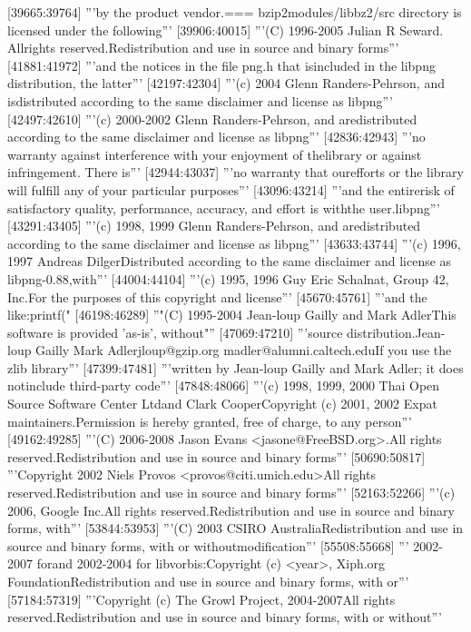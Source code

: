 \documentclass[10pt,a4paper]{article}
\begin{document}
{[39665:39764] '''by the product vendor.\n\n=== bzip2\n\nThe modules/libbz2/src directory is licensed under the following'''
[39906:40015] '''(C) 1996-2005 Julian R Seward.  All\n  rights reserved.\n  \n  Redistribution and use in source and binary forms'''
[41881:41972] '''and the notices in the file png.h that is\n  included in the libpng distribution, the latter'''
[42197:42304] '''(c) 2004 Glenn Randers-Pehrson, and is\n  distributed according to the same disclaimer and license as libpng'''
[42497:42610] '''(c) 2000-2002 Glenn Randers-Pehrson, and are\n  distributed according to the same disclaimer and license as libpng'''
[42836:42943] '''no warranty against interference with your enjoyment of the\n     library or against infringement.  There is'''
[42944:43037] '''no warranty that our\n     efforts or the library will fulfill any of your particular purposes'''
[43096:43214] '''and the entire\n     risk of satisfactory quality, performance, accuracy, and effort is with\n     the user.\n  \n  libpng'''
[43291:43405] '''(c) 1998, 1999 Glenn Randers-Pehrson, and are\n  distributed according to the same disclaimer and license as libpng'''
[43633:43744] '''(c) 1996, 1997 Andreas Dilger\n  Distributed according to the same disclaimer and license as libpng-0.88,\n  with'''
[44004:44104] '''(c) 1995, 1996 Guy Eric Schalnat, Group 42, Inc.\n  \n  For the purposes of this copyright and license'''
[45670:45761] '''and the like:\n  \n     printf("%
[46198:46289] ''"(C) 1995-2004 Jean-loup Gailly and Mark Adler\n\n  This software is provided 'as-is', without"''
[47069:47210] '''source distribution.\n\n  Jean-loup Gailly        Mark Adler\n  jloup@gzip.org          madler@alumni.caltech.edu\n\n  If you use the zlib library'''
[47399:47481] '''written by Jean-loup Gailly and Mark Adler; it does not\n  include third-party code'''
[47848:48066] '''(c) 1998, 1999, 2000 Thai Open Source Software Center Ltd\n                                 and Clark Cooper\n  Copyright (c) 2001, 2002 Expat maintainers.\n  \n  Permission is hereby granted, free of charge, to any person'''
[49162:49285] '''(C) 2006-2008 Jason Evans <jasone@FreeBSD.org>.\n  All rights reserved.\n\n  Redistribution and use in source and binary forms'''
[50690:50817] '''Copyright 2002 Niels Provos <provos@citi.umich.edu>\n  All rights reserved.\n\n  Redistribution and use in source and binary forms'''
[52163:52266] '''(c) 2006, Google Inc.\n  All rights reserved.\n\n  Redistribution and use in source and binary forms, with'''
[53844:53953] '''(C) 2003 CSIRO Australia\n\n  Redistribution and use in source and binary forms, with or without\n  modification'''
[55508:55668] ''' 2002-2007 for\nlibtheora and 2002-2004 for libvorbis:\n\n  Copyright (c) <year>, Xiph.org Foundation\n\n  Redistribution and use in source and binary forms, with or'''
[57184:57319] '''Copyright (c) The Growl Project, 2004-2007\n  All rights reserved.\n\n  Redistribution and use in source and binary forms, with or without'''
}
\end{document}
